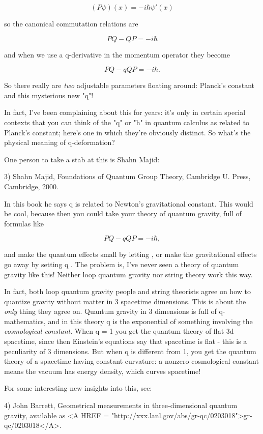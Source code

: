$$
(P \psi )(x) = -i \hbar  \psi '(x)
$$
    
so the canonical commutation relations are 

$$
PQ - QP = -i \hbar 
$$
    
and when we use a q-derivative in the momentum operator they become

$$
PQ - qQP = -i \hbar .
$$
    
So there really are \emph{two} adjustable parameters floating around:
Planck's constant and this mysterious new "q"!

In fact, I've been complaining about this for years: it's only in
certain special contexts that you can think of the "q" or
"h" in quantum calculus as related to Planck's constant;
here's one in which they're obviously distinct.  So what's the physical
meaning of q-deformation?

One person to take a stab at this is Shahn Majid:

3) Shahn Majid, Foundations of Quantum Group Theory, Cambridge U.
Press, Cambridge, 2000.

In this book he says q is related to Newton's gravitational constant.
This would be cool, because then you could take your theory of quantum 
gravity, full of formulas like

$$
PQ - qQP = -i \hbar ,
$$
    
and make the quantum effects small by letting \hbar  {}, or make the
gravitational effects go away by setting q .  The problem is, I've
never seen a theory of quantum gravity like this!  Neither loop quantum
gravity nor string theory work this way.  

In fact, both loop quantum gravity people and string theorists agree  
on how to quantize gravity without matter in 3 spacetime dimensions.  
This is about the \emph{only} thing they agree on.  Quantum gravity in 3
dimensions is full of q-mathematics, and in this theory q is the
exponential of something involving the \emph{cosmological constant}.   
When q = 1 you get the quantum theory of flat 3d spacetime, since then
Einstein's equations say that spacetime is flat - this is a peculiarity
of 3 dimensions.  But when q is different from 1, you get the quantum
theory of a spacetime having constant curvature: a nonzero cosmological
constant means the vacuum has energy density, which curves spacetime!  

For some interesting new insights into this, see:

4) John Barrett, Geometrical measurements in three-dimensional
quantum gravity, available as <A HREF = "http://xxx.lanl.gov/abs/gr-qc/0203018">gr-qc/0203018</A>.



